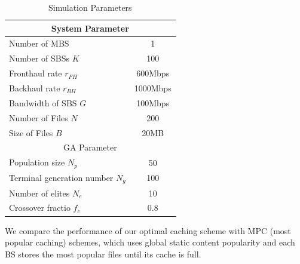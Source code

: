 \documentclass[conference]{IEEEtran}
\begin{document}
\begin{table}[htbp]
 \caption{Simulation Parameters}
 \begin{center}
  \begin{tabular}{|l|c|}
   \hline
   \multicolumn{2}{|c|}{System Parameter}                \\\hline
   Number of MBS                  & 1                 \\ \hline
   Number of SBSs $K$    & 100                \\\hline
   Fronthaul rate $r_{FH}$        & 600Mbps               \\ \hline
   Backhaul rate $r_{BH}$         & 1000Mbps               \\\hline
   Bandwidth of SBS $G$            &  100Mbps              \\\hline
   Number of Files $N$           & 200               \\\hline
   Size of Files $B$            & 20MB            \\\hline
   \multicolumn{2}{|c|}{GA Parameter}                \\\hline
   Population size $N_p$         & 50              \\\hline
   Terminal generation number $N_g$  & 100               \\\hline
   Number of elites $N_e$        & 10              \\\hline
   Crossover fractio $f_c$            & 0.8            \\\hline
  \end{tabular}
  \label{tab1}
 \end{center}
\end{table}

We compare the performance of our optimal caching scheme with MPC (most popular caching) schemes, which uses global static content popularity and each BS stores the most popular files until its cache is full\cite{6600983}.
\end{document}
